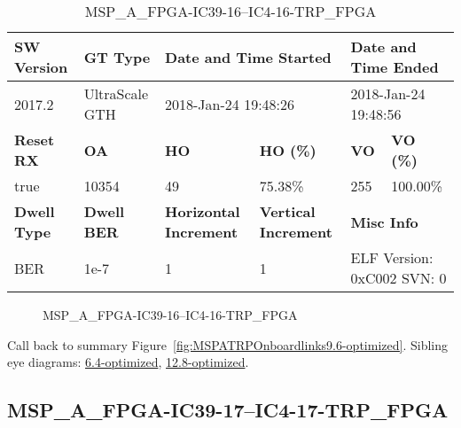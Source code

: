 \begin{table}[h]
\centering
\caption{MSP\_A\_FPGA-IC39-16--IC4-16-TRP\_FPGA}
\label{tab:MSPAFPGAIC3916IC416TRPFPGA9.6-optimized}
\begin{tabular}{@{}|l|l|l|l|l|l|@{}}
\toprule
\textbf{SW Version}                & \textbf{GT Type}   & \multicolumn{2}{l|}{\textbf{Date and Time Started}}            & \multicolumn{2}{l|}{\textbf{Date and Time Ended}}        \\ \midrule
2017.2                       & UltraScale GTH          & \multicolumn{2}{l|}{2018-Jan-24 19:48:26}                   & \multicolumn{2}{l|}{2018-Jan-24 19:48:56}               \\ \midrule
\textbf{Reset RX}                  & \textbf{OA} & \textbf{HO}   & \textbf{HO (\%)} & \textbf{VO} & \textbf{VO (\%)} \\ \midrule
true & 10354        & 49          & 75.38\%        & 255        & 100.00\%       \\ \midrule
\textbf{Dwell Type}                & \textbf{Dwell BER} & \textbf{Horizontal Increment} & \textbf{Vertical Increment}    & \multicolumn{2}{l|}{\textbf{Misc Info}}                  \\ \midrule
BER                            & 1e-7        & 1        & 1           & \multicolumn{2}{l|}{ELF Version: 0xC002 SVN: 0}                         \\ \bottomrule
\end{tabular}
\end{table}

\begin{figure}[h]
\caption{MSP\_A\_FPGA-IC39-16--IC4-16-TRP\_FPGA} \label{fig:MSPAFPGAIC3916IC416TRPFPGA9.6-optimized}
\end{figure}

Call back to summary Figure~\ref{fig:MSPATRPOnboardlinks9.6-optimized}.
Sibling eye diagrams: \hyperref[sec:MSPAFPGAIC3916IC416TRPFPGA6.4-optimized]{6.4-optimized}, \hyperref[sec:MSPAFPGAIC3916IC416TRPFPGA12.8-optimized]{12.8-optimized}.

\clearpage
\newpage


\subsection{MSP\_A\_FPGA-IC39-17--IC4-17-TRP\_FPGA}\label{sec:MSPAFPGAIC3917IC417TRPFPGA9.6-optimized}

